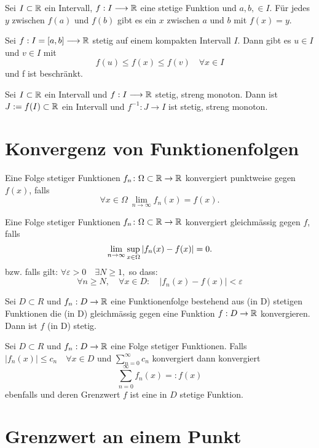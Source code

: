 \Satz[Zwischenwertsatz] Sei $I \subset \mathbb{R}$ ein Intervall, $f: I \longrightarrow \mathbb{R}$ eine stetige Funktion und $a, b, \in I$. Für jedes $y$ zwischen $f(a)$ und $f(b)$ gibt es ein $x$ zwischen $a$ und $b$ mit $f(x)=y$.

 Sei $f: I=[a, b] \longrightarrow \mathbb{R}$ stetig auf einem kompakten Intervall $I$. Dann gibt es $u \in I$ und $v \in I$ mit
$$f(u) \leqslant f(x) \leqslant f(v) \quad \forall x \in I$$
und f ist beschränkt.

\Satz[Umkehrabbildung] Sei $I \subset \mathbb{R}$ ein Intervall und $f: I \longrightarrow \mathbb{R}$ stetig, streng monoton. Dann ist $J:=f(I) \subset \mathbb{R}$ ein Intervall und $f^{-1}: J \longrightarrow I$ ist stetig, streng monoton.

\section{Konvergenz von Funktionenfolgen}

\Def[Punktweise] Eine Folge stetiger Funktionen $f_n\colon\Omega\subset\mathbb{R}\to\mathbb{R}$
konvergiert punktweise gegen $f(x)$, falls
\[
\forall x\in\Omega \ \lim_{n\to\infty} f_n(x) = f(x).
\]

\Def[Gleichmässig] Eine Folge stetiger Funktionen $f_n\colon\Omega\subset\mathbb{R}\to\mathbb{R}$
konvergiert gleichmässig gegen $f$, falls
\[
\lim_{n\to\infty} \sup_{x\in\Omega} \left\lvert f_n(x)-f(x) \right\rvert = 0.
\]
bzw. falls gilt: $\forall \varepsilon>0  \quad \exists N \geqslant 1,$ so dass:
$$
\forall n \geqslant N, \quad \forall x \in D: \quad\left|f_{n}(x)-f(x)\right|<\varepsilon
$$

 Sei $D \subset R$ und $f_{n}: D \rightarrow \mathbb{R}$ eine Funktionenfolge bestehend aus (in
D) stetigen Funktionen die (in D) gleichmässig gegen eine Funktion $f: D \rightarrow \mathbb{R}$ konvergieren. Dann ist $f$ (in D) stetig.

 Sei $D \subset R$ und $f_{n}: D \rightarrow \mathbb{R}$ eine Folge stetiger Funktionen. Falls  $\left|f_{n}(x)\right| \leqslant c_{n} \quad \forall x \in D$ und $\sum_{n=0}^{\infty} c_{n}$ konvergiert dann konvergiert 
$$\sum\limits_{n=0}^{\infty} f_n(x)  =: f(x)$$
ebenfalls und deren Grenzwert $f$ ist eine in $D$ stetige Funktion.

\section{Grenzwert an einem Punkt}

